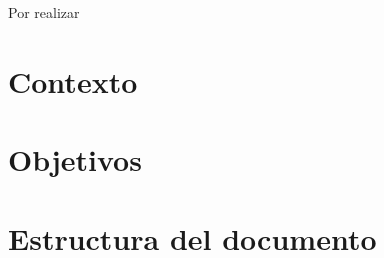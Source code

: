 \documentclass[../main.tex]{subfiles}
\begin{document}
Por realizar
\section{Contexto}
\section{Objetivos}
\section{Estructura del documento}
\end{document}
